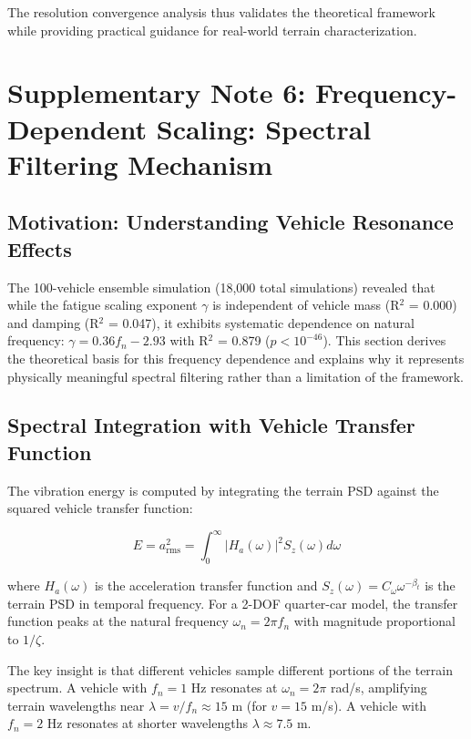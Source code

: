 \documentclass[11pt,letterpaper]{article}
\begin{document}
The resolution convergence analysis thus validates the theoretical framework while providing practical guidance for real-world terrain characterization.


\section{Supplementary Note 6: Frequency-Dependent Scaling: Spectral Filtering Mechanism}

\subsection{Motivation: Understanding Vehicle Resonance Effects}

The 100-vehicle ensemble simulation (18,000 total simulations) revealed that while the fatigue scaling exponent $\gamma$ is independent of vehicle mass (R$^2$ = 0.000) and damping (R$^2$ = 0.047), it exhibits systematic dependence on natural frequency: $\gamma = 0.36 f_n - 2.93$ with R$^2$ = 0.879 ($p < 10^{-46}$). This section derives the theoretical basis for this frequency dependence and explains why it represents physically meaningful spectral filtering rather than a limitation of the framework.

\subsection{Spectral Integration with Vehicle Transfer Function}

The vibration energy is computed by integrating the terrain PSD against the squared vehicle transfer function:

\begin{equation}
E = a_{\text{rms}}^2 = \int_0^\infty |H_a(\omega)|^2 S_z(\omega) d\omega
\end{equation}

where $H_a(\omega)$ is the acceleration transfer function and $S_z(\omega) = C_\omega \omega^{-\beta_t}$ is the terrain PSD in temporal frequency. For a 2-DOF quarter-car model, the transfer function peaks at the natural frequency $\omega_n = 2\pi f_n$ with magnitude proportional to $1/\zeta$.

The key insight is that different vehicles sample different portions of the terrain spectrum. A vehicle with $f_n = 1$ Hz resonates at $\omega_n = 2\pi$ rad/s, amplifying terrain wavelengths near $\lambda = v/f_n \approx 15$ m (for $v = 15$ m/s). A vehicle with $f_n = 2$ Hz resonates at shorter wavelengths $\lambda \approx 7.5$ m.
\end{document}
